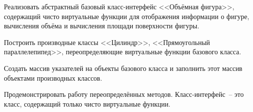 Реализовать абстрактный базовый класс-интерфейс
<<Объёмная фигура>>, содержащий чисто виртуальные
функции для отображения информации о фигуре,
вычисления объёма и вычисления площади поверхности
фигуры.

Построить производные классы <<Цилиндр>>,
<<Прямоугольный параллелепипед>>, переопределяющие
виртуальные функции базового класса.

Создать массив
указателей на объекты базового класса и заполнить этот
массив объектами производных классов.

Продемонстрировать работу переопределённых методов.
Класс-интерфейс~-- это класс, содержащий только чисто
виртуальные функции.
